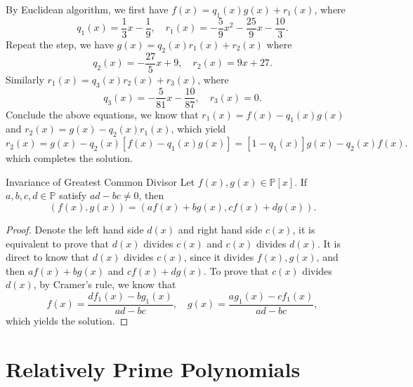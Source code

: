 \begin{solution}
  By Euclidean algorithm, we first have
  $f(x) = q_1(x)g(x) + r_1(x)$, where
  \begin{equation}
    q_1(x) = \frac{1}{3}x - \frac{1}{9}, \quad
    r_1(x) = - \frac{5}{9}x^2 - \frac{25}{9}x - \frac{10}{3}.
  \end{equation}
  Repeat the step, we have $g(x) = q_2(x)r_1(x) + r_2(x)$ where
  \begin{equation}
    q_2(x) = - \frac{27}{5}x + 9, \quad
    r_2(x) = 9x + 27.
  \end{equation}
  Similarly $r_1(x) = q_3(x)r_2(x) + r_3(x)$, where
  \begin{equation}
    q_3(x) = - \frac{5}{81}x - \frac{10}{87}, \quad
    r_3(x) = 0.
  \end{equation}
  Conclude the above equations, we know that $r_1(x) = f(x) - q_1(x)g(x)$ and
  $r_2(x) = g(x) - q_2(x)r_1(x)$, which yield
  \begin{equation}
    r_2(x) = g(x) - q_2(x)[f(x) - q_1(x)g(x)]
    = [1 - q_1(x)]g(x) - q_2(x)f(x).
  \end{equation}
  which completes the solution.
\end{solution}

\begin{proposition}{Invariance of Greatest Common Divisor}{}
  Let $f(x), g(x) \in \mathbb{P}[x]$. If $a,b,c,d \in \mathbb{P}$ satisfy $ad-bc
  \neq 0$, then
  \begin{equation}
    \left( f(x), g(x) \right) = (af(x) + bg(x), cf(x) + dg(x)).
  \end{equation}
\end{proposition}

\begin{proof}
  Denote the left hand side $d(x)$ and right hand side $c(x)$,
  it is equivalent to prove that $d(x)$ divides $c(x)$ and $c(x)$ divides $d(x)$.
  It is direct to know that $d(x)$ divides $c(x)$, since it divides $f(x),
  g(x)$, and then $af(x) + bg(x)$ and $cf(x) + dg(x)$.
  To prove that $c(x)$ divides $d(x)$, by Cramer's rule, we know that
  \begin{equation}
    f(x) = \frac{df_1(x) - bg_1(x)}{ad - bc}, \quad
    g(x) = \frac{ag_1(x) - cf_1(x)}{ad - bc},
  \end{equation}
  which yields the solution.
\end{proof}

\section{Relatively Prime Polynomials}

